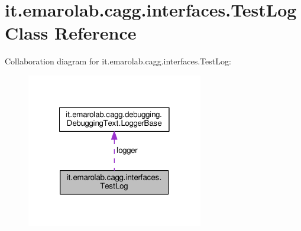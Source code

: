 \hypertarget{classit_1_1emarolab_1_1cagg_1_1interfaces_1_1TestLog}{\section{it.\-emarolab.\-cagg.\-interfaces.\-Test\-Log Class Reference}
\label{classit_1_1emarolab_1_1cagg_1_1interfaces_1_1TestLog}
}


Collaboration diagram for it.\-emarolab.\-cagg.\-interfaces.\-Test\-Log\-:\nopagebreak
\begin{figure}[H]
\begin{center}
\leavevmode
\includegraphics[width=218pt]{classit_1_1emarolab_1_1cagg_1_1interfaces_1_1TestLog__coll__graph}
\end{center}
\end{figure}
